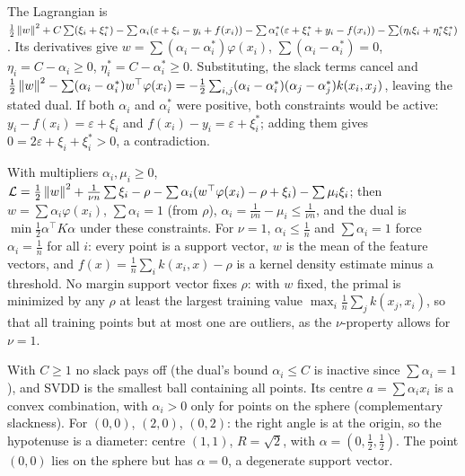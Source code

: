 \section{}

The Lagrangian is
$\frac12\left\|w\right\|^2 + C\sum(\xi_i + \xi_i^*) - \sum\alpha_i(\varepsilon + \xi_i - y_i + f(x_i)) - \sum\alpha_i^*(\varepsilon + \xi_i^* + y_i - f(x_i)) - \sum(\eta_i\xi_i + \eta_i^*\xi_i^*)$.
Its derivatives give $w = \sum(\alpha_i - \alpha_i^*)\varphi(x_i)$, $\sum(\alpha_i - \alpha_i^*) = 0$, $\eta_i = C - \alpha_i\geq0$, $\eta_i^* = C - \alpha_i^*\geq0$.
Substituting, the slack terms cancel and
$\frac12\left\|w\right\|^2 - \sum(\alpha_i - \alpha_i^*)w^\top\varphi(x_i) = -\frac12\sum_{i,j}(\alpha_i - \alpha_i^*)(\alpha_j - \alpha_j^*)k(x_i, x_j)$, leaving the stated dual. If both
$\alpha_i$ and $\alpha_i^*$ were positive, both constraints would be active: $y_i - f(x_i) = \varepsilon + \xi_i$ and
$f(x_i) - y_i = \varepsilon + \xi_i^*$; adding them gives $0 = 2\varepsilon + \xi_i + \xi_i^*>0$, a contradiction.

With multipliers $\alpha_i, \mu_i\geq0$, $\mathcal L = \frac12\left\|w\right\|^2 + \frac1{\nu n}\sum\xi_i - \rho - \sum\alpha_i(w^\top\varphi(x_i) - \rho + \xi_i) - \sum\mu_i\xi_i$; then
$w = \sum\alpha_i\varphi(x_i)$, $\sum\alpha_i = 1$ (from $\rho$), $\alpha_i = \frac1{\nu n} - \mu_i\leq\frac1{\nu n}$, and the dual is
$\min\frac12\alpha^\top K\alpha$ under these constraints. For $\nu = 1$, $\alpha_i\leq\frac1n$ and $\sum\alpha_i = 1$ force $\alpha_i = \frac1n$ for all $i$:
every point is a support vector, $w$ is the mean of the feature vectors, and $f(x) = \frac1n\sum_ik(x_i, x) - \rho$
is a kernel density estimate minus a threshold. No margin support vector fixes $\rho$: with $w$ fixed,
the primal is minimized by any $\rho$ at least the largest training value $\max_i\frac1n\sum_jk(x_j, x_i)$,
so that all training points but at most one are outliers, as the $\nu$-property allows for $\nu = 1$.

With $C\geq1$ no slack pays off (the dual's bound $\alpha_i\leq C$ is inactive since $\sum\alpha_i = 1$), and SVDD is the
smallest ball containing all points. Its centre $a = \sum\alpha_ix_i$ is a convex combination, with
$\alpha_i>0$ only for points on the sphere (complementary slackness). For $(0,0)$, $(2,0)$, $(0,2)$:
the right angle is at the origin, so the hypotenuse is a diameter: centre $(1, 1)$, $R = \sqrt2$, with
$\alpha = (0, \frac12, \frac12)$. The point $(0, 0)$ lies on the sphere but has $\alpha = 0$, a degenerate support vector.

